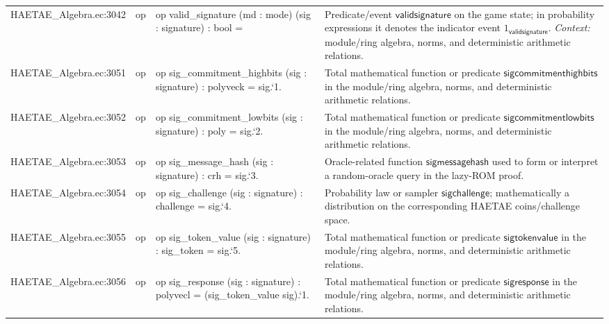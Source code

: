 \documentclass[10pt]{article}
\begin{document}
\begin{longtable}{L{0.11\textwidth}L{0.055\textwidth}L{0.385\textwidth}L{0.41\textwidth}}
HAETAE\_\allowbreak{}Algebra.\allowbreak{}ec:\allowbreak{}3042 & op & {\ttfamily\scriptsize op valid\_\allowbreak{}signature (md : mode) (sig : signature) : bool =} & Predicate/event $\mathsf{validsignature}$ on the game state; in probability expressions it denotes the indicator event $1_{\mathsf{validsignature}}$. \emph{Context:} module/ring algebra, norms, and deterministic arithmetic relations. \\
HAETAE\_\allowbreak{}Algebra.\allowbreak{}ec:\allowbreak{}3051 & op & {\ttfamily\scriptsize op sig\_\allowbreak{}commitment\_\allowbreak{}highbits (sig : signature) : polyveck = sig.`1.} & Total mathematical function or predicate $\mathsf{sigcommitmenthighbits}$ in the module/ring algebra, norms, and deterministic arithmetic relations. \\
HAETAE\_\allowbreak{}Algebra.\allowbreak{}ec:\allowbreak{}3052 & op & {\ttfamily\scriptsize op sig\_\allowbreak{}commitment\_\allowbreak{}lowbits (sig : signature) : poly = sig.`2.} & Total mathematical function or predicate $\mathsf{sigcommitmentlowbits}$ in the module/ring algebra, norms, and deterministic arithmetic relations. \\
HAETAE\_\allowbreak{}Algebra.\allowbreak{}ec:\allowbreak{}3053 & op & {\ttfamily\scriptsize op sig\_\allowbreak{}message\_\allowbreak{}hash (sig : signature) : crh = sig.`3.} & Oracle-related function $\mathsf{sigmessagehash}$ used to form or interpret a random-oracle query in the lazy-ROM proof. \\
HAETAE\_\allowbreak{}Algebra.\allowbreak{}ec:\allowbreak{}3054 & op & {\ttfamily\scriptsize op sig\_\allowbreak{}challenge (sig : signature) : challenge = sig.`4.} & Probability law or sampler $\mathsf{sigchallenge}$; mathematically a distribution on the corresponding HAETAE coins/challenge space. \\
HAETAE\_\allowbreak{}Algebra.\allowbreak{}ec:\allowbreak{}3055 & op & {\ttfamily\scriptsize op sig\_\allowbreak{}token\_\allowbreak{}value (sig : signature) : sig\_\allowbreak{}token = sig.`5.} & Total mathematical function or predicate $\mathsf{sigtokenvalue}$ in the module/ring algebra, norms, and deterministic arithmetic relations. \\
HAETAE\_\allowbreak{}Algebra.\allowbreak{}ec:\allowbreak{}3056 & op & {\ttfamily\scriptsize op sig\_\allowbreak{}response (sig : signature) : polyvecl = (sig\_\allowbreak{}token\_\allowbreak{}value sig).`1.} & Total mathematical function or predicate $\mathsf{sigresponse}$ in the module/ring algebra, norms, and deterministic arithmetic relations. \\

\end{longtable}
\end{document}
